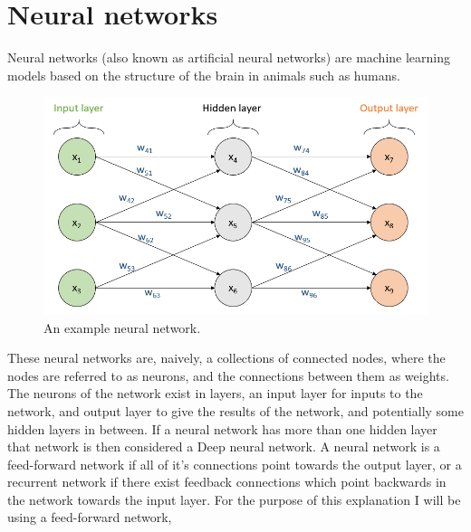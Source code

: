 \documentclass[10pt]{article}
\begin{document}
	\bigskip
	
	\section{Neural networks}
		Neural networks (also known as artificial neural networks) are machine learning models based on the structure of the brain in animals such as humans.\\
		
		\begin{figure}[h]			
			\includegraphics[scale=0.5]{img/network}
			\centering
			\caption{An example neural network.}
			\label{nnetwork}
		\end{figure}	
		
		These neural networks are, naively, a collections of connected nodes, where the nodes are referred to as neurons, and the connections between them as weights. The neurons of the network exist in layers, an input layer for inputs to the network, and output layer to give the results of the network, and potentially some hidden layers in between. If a neural network has more than one hidden layer that network is then considered a Deep neural network. A neural network is a feed-forward network if all of it's connections point towards the output layer, or a recurrent network if there exist feedback connections which point backwards in the network towards the input layer. For the purpose of this explanation I will be using a feed-forward network,\\
		
\end{document}
